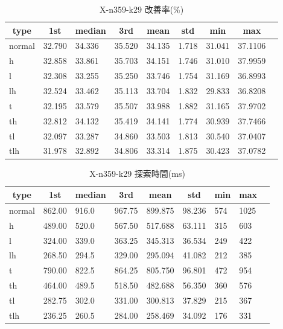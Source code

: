 \begin{table}[htbp]
    \caption{X-n359-k29 改善率(\%)}
    \begin{tabular}{|l|l|l|l|l|l|l|l|l|}\hline
    \multicolumn{1}{|c|}{\textbf{type}}
    &\multicolumn{1}{|c|}{\textbf{1st}}
    &\multicolumn{1}{c|}{\textbf{median}}
    &\multicolumn{1}{c|}{\textbf{3rd}}
    &\multicolumn{1}{c|}{\textbf{mean}}
    &\multicolumn{1}{c|}{\textbf{std}}
    &\multicolumn{1}{c|}{\textbf{min}}
    &\multicolumn{1}{c|}{\textbf{max}}\\\hline
	normal & 32.790 & 34.336 & 35.520 & 34.135 & 1.718 & 31.041 & 37.1106\\\hline
	h & 32.858 & 33.861 & 35.703 & 34.151 & 1.746 & 31.010 & 37.9959\\\hline
	l & 32.308 & 33.255 & 35.250 & 33.746 & 1.754 & 31.169 & 36.8993\\\hline
	lh & 32.524 & 33.462 & 35.113 & 33.704 & 1.832 & 29.833 & 36.8208\\\hline
	t & 32.195 & 33.579 & 35.507 & 33.988 & 1.882 & 31.165 & 37.9702\\\hline
	th & 32.812 & 34.132 & 35.419 & 34.141 & 1.774 & 30.939 & 37.7466\\\hline
	tl & 32.097 & 33.287 & 34.860 & 33.503 & 1.813 & 30.540 & 37.0407\\\hline
	tlh & 31.978 & 32.892 & 34.806 & 33.314 & 1.875 & 30.423 & 37.0782\\\hline
	\end{tabular}
\end{table}
\begin{table}[htbp]
    \caption{X-n359-k29 探索時間(ms)}
    \begin{tabular}{|l|l|l|l|l|l|l|l|l|}\hline
    \multicolumn{1}{|c|}{\textbf{type}}
    &\multicolumn{1}{|c|}{\textbf{1st}}
    &\multicolumn{1}{c|}{\textbf{median}}
    &\multicolumn{1}{c|}{\textbf{3rd}}
    &\multicolumn{1}{c|}{\textbf{mean}}
    &\multicolumn{1}{c|}{\textbf{std}}
    &\multicolumn{1}{c|}{\textbf{min}}
    &\multicolumn{1}{c|}{\textbf{max}}\\\hline
	normal & 862.00 & 916.0 & 967.75 & 899.875 & 98.236 & 574 & 1025\\\hline
	h & 489.00 & 520.0 & 567.50 & 517.688 & 63.111 & 315 & 603\\\hline
	l & 324.00 & 339.0 & 363.25 & 345.313 & 36.534 & 249 & 422\\\hline
	lh & 268.50 & 294.5 & 329.00 & 295.094 & 41.082 & 212 & 385\\\hline
	t & 790.00 & 822.5 & 864.25 & 805.750 & 96.801 & 472 & 954\\\hline
	th & 464.00 & 489.5 & 518.50 & 482.688 & 56.350 & 360 & 576\\\hline
	tl & 282.75 & 302.0 & 331.00 & 300.813 & 37.829 & 215 & 367\\\hline
	tlh & 236.25 & 260.5 & 284.00 & 258.469 & 34.092 & 176 & 331\\\hline
	\end{tabular}
\end{table}
